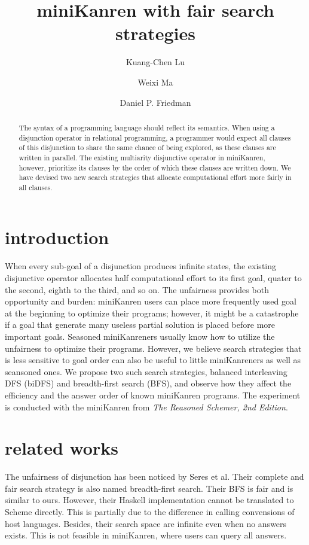\documentclass[format=acmlarge, review=true, authordraft=true]{acmart}
\title{miniKanren with fair search strategies}
\author{Kuang-Chen Lu}
\affiliation{Indiana University}
\author{Weixi Ma}
\affiliation{Indiana University}
\author{Daniel P. Friedman}
\affiliation{Indiana University}
\begin{document}
\begin{abstract}

The syntax of a programming language should reflect its semantics. When using a
disjunction operator in relational programming, a programmer would expect all
clauses of this disjunction to share the same chance of being explored, as
these clauses are written in parallel. The existing multiarity disjunctive
operator in miniKanren, however, prioritize its clauses by the order of which
these clauses are written down. We have devised two new search strategies that
allocate computational effort more fairly in all clauses.

\end{abstract}

\maketitle

\section{introduction}

When every sub-goal of a disjunction produces infinite states, the existing 
disjunctive operator allocates half computational effort to its first goal, 
quater to the second, eighth to the third, and so on. The unfairness provides 
both opportunity and burden: miniKanren users can place more frequently used 
goal at the beginning to optimize their programs; however, it might be a 
catastrophe if a goal that generate many useless partial solution is placed 
before more important goals. Seasoned miniKanreners usually know how to utilize 
the unfairness to optimize their programs. However, we believe search strategies 
that is less sensitive to goal order can also be useful to little miniKanreners 
as well as seansoned ones. We propose two such search strategies, balanced 
interleaving DFS (biDFS) and breadth-first search (BFS), and observe how they 
affect the efficiency and the answer order of known miniKanren programs. The 
experiment is conducted with the miniKanren from \textit{The Reasoned Schemer, 
2nd Edition}.

\section{related works}

The unfairness of disjunction has been noticed by Seres et al. Their complete 
and fair search strategy is also named breadth-first search. Their BFS 
is fair and is similar to ours. However, their Haskell implementation cannot be 
translated to Scheme directly. This is partially due to the difference in 
calling convensions of host languages. Besides, their search space are infinite 
even when no answers exists. This is not feasible in miniKanren, where 
users can query all answers.
\end{document}
